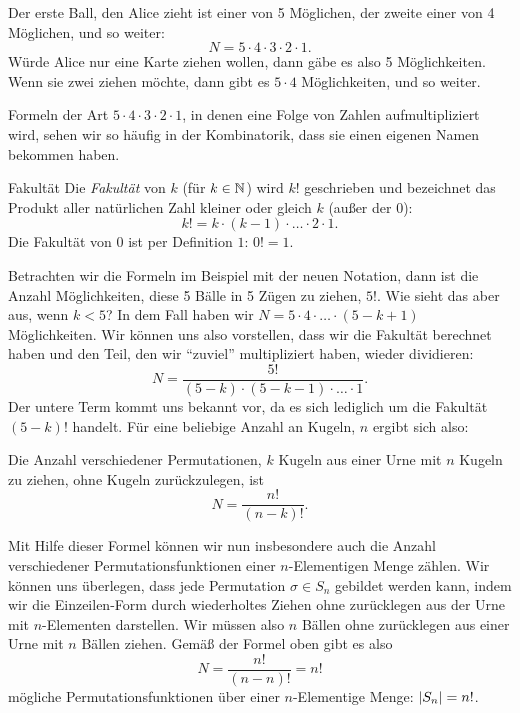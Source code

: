 \documentclass[../../main.tex]{subfiles}
\begin{document}
\begin{example}{}
        Der erste Ball, den Alice zieht ist einer von 5 Möglichen, der zweite einer von 4 Möglichen, und so weiter:
        $$N = 5\cdot 4 \cdot 3 \cdot 2 \cdot 1.$$
        Würde Alice nur eine Karte ziehen wollen, dann gäbe es also 5 Möglichkeiten. Wenn sie zwei ziehen möchte, dann gibt es $5\cdot 4$ Möglichkeiten, und so weiter.
    \end{example}
    
    Formeln der Art $5\cdot 4\cdot 3\cdot 2\cdot 1$, in denen eine Folge von Zahlen aufmultipliziert wird, sehen wir so häufig in der Kombinatorik, dass sie einen eigenen Namen bekommen haben.
    
    \begin{definition}{Fakultät}
        Die \emph{Fakultät} von $k$ (für $k\in\mathbb{N}$) wird $k!$ geschrieben und bezeichnet das Produkt aller natürlichen Zahl kleiner oder gleich $k$ (außer der 0):
        $$k! = k\cdot (k-1) \cdot \ldots \cdot 2 \cdot 1.$$
        Die Fakultät von $0$ ist per Definition $1$: $0! = 1$.
    \end{definition}
    
    Betrachten wir die Formeln im Beispiel mit der neuen Notation, dann ist die Anzahl Möglichkeiten, diese 5 Bälle in 5 Zügen zu ziehen, $5!$. Wie sieht das aber aus, wenn $k < 5$? In dem Fall haben wir $N = 5\cdot 4 \cdot \ldots \cdot (5-k+1)$ Möglichkeiten. Wir können uns also vorstellen, dass wir die Fakultät berechnet haben und den Teil, den wir \enquote{zuviel} multipliziert haben, wieder dividieren:
    $$N = \frac{5!}{(5-k) \cdot (5-k-1) \cdot \ldots \cdot 1}.$$
    Der untere Term kommt uns bekannt vor, da es sich lediglich um die Fakultät $(5-k)!$ handelt. Für eine beliebige Anzahl an Kugeln, $n$ ergibt sich also:
    \begin{lemma}{}
        Die Anzahl verschiedener Permutationen, $k$ Kugeln aus einer Urne mit $n$ Kugeln zu ziehen, ohne Kugeln zurückzulegen, ist $$N = \frac{n!}{(n-k)!}.$$
    \end{lemma}
    
    Mit Hilfe dieser Formel können wir nun insbesondere auch die Anzahl verschiedener Permutationsfunktionen einer $n$-Elementigen Menge zählen. Wir können uns überlegen, dass jede Permutation $\sigma \in S_n$ gebildet werden kann, indem wir die Einzeilen-Form durch wiederholtes Ziehen ohne zurücklegen aus der Urne mit $n$-Elementen darstellen. Wir müssen also $n$ Bällen ohne zurücklegen aus einer Urne mit $n$ Bällen ziehen. Gemäß der Formel oben gibt es also
    $$N = \frac{n!}{(n-n)!} = n!$$
    mögliche Permutationsfunktionen über einer $n$-Elementige Menge: $\lvert S_n\rvert = n!$.
    
\end{document}

